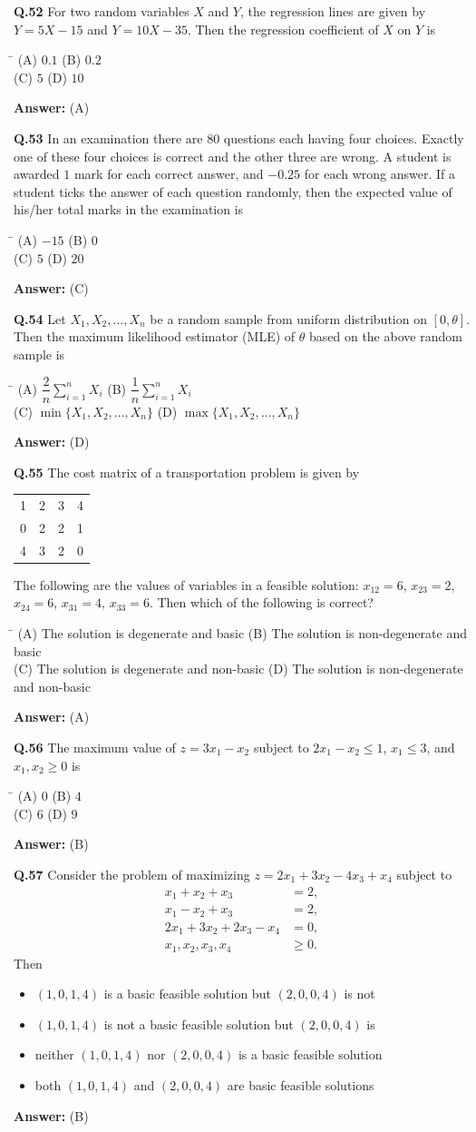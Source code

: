 \documentclass[11pt,a4paper]{article}
\newcommand{\optsfourA}[4]{%
  \begin{tabbing}
    \hspace{0.48\linewidth}\=\kill
    (A) #1 \> (B) #2 \\[2pt]
    (C) #3 \> (D) #4
  \end{tabbing}%
}
\newcommand{\optslistA}[4]{%
  \begin{itemize}
    \setlength{\itemsep}{2pt}\setlength{\parskip}{0pt}
    \item[(A)] #1
    \item[(B)] #2
    \item[(C)] #3
    \item[(D)] #4
  \end{itemize}%
}
\newcommand{\ans}[1]{\textbf{Answer:} #1\par\medskip}
\begin{document}
\textbf{Q.52} For two random variables $X$ and $Y$, the regression lines are given by $Y = 5X - 15$ and $Y = 10X - 35$. Then the regression coefficient of $X$ on $Y$ is
\optsfourA{$0.1$}{$0.2$}{$5$}{$10$}
\ans{(A)}

\textbf{Q.53} In an examination there are $80$ questions each having four choices. Exactly one of these four choices is correct and the other three are wrong. A student is awarded $1$ mark for each correct answer, and $-0.25$ for each wrong answer. If a student ticks the answer of each question randomly, then the expected value of his/her total marks in the examination is
\optsfourA{$-15$}{$0$}{$5$}{$20$}
\ans{(C)}

\textbf{Q.54} Let $X_1, X_2, \dots, X_n$ be a random sample from uniform distribution on $[0, \theta]$. Then the maximum likelihood estimator (MLE) of $\theta$ based on the above random sample is
\optsfourA{$\dfrac{2}{n}\displaystyle\sum_{i=1}^{n} X_i$}{$\dfrac{1}{n}\displaystyle\sum_{i=1}^{n} X_i$}{$\min\{X_1, X_2, \dots, X_n\}$}{$\max\{X_1, X_2, \dots, X_n\}$}
\ans{(D)}

\textbf{Q.55} The cost matrix of a transportation problem is given by
\begin{center}
\begin{tabular}{cccc}
  \toprule
  1 & 2 & 3 & 4 \\
  0 & 2 & 2 & 1 \\
  4 & 3 & 2 & 0 \\
  \bottomrule
\end{tabular}
\end{center}
The following are the values of variables in a feasible solution: $x_{12} = 6$, $x_{23} = 2$, $x_{24} = 6$, $x_{31} = 4$, $x_{33} = 6$. Then which of the following is correct?
\optsfourA{The solution is degenerate and basic}{The solution is non-degenerate and basic}{The solution is degenerate and non-basic}{The solution is non-degenerate and non-basic}
\ans{(A)}

\textbf{Q.56} The maximum value of $z = 3x_1 - x_2$ subject to $2x_1 - x_2 \le 1$, $x_1 \le 3$, and $x_1, x_2 \ge 0$ is
\optsfourA{$0$}{$4$}{$6$}{$9$}
\ans{(B)}

\textbf{Q.57} Consider the problem of maximizing $z = 2x_1 + 3x_2 - 4x_3 + x_4$ subject to
\begin{align*}
  x_1 + x_2 + x_3 &= 2, \\
  x_1 - x_2 + x_3 &= 2, \\
  2x_1 + 3x_2 + 2x_3 - x_4 &= 0, \\
  x_1, x_2, x_3, x_4 &\ge 0.
\end{align*}
Then
\optslistA{$(1,0,1,4)$ is a basic feasible solution but $(2,0,0,4)$ is not}{$(1,0,1,4)$ is not a basic feasible solution but $(2,0,0,4)$ is}{neither $(1,0,1,4)$ nor $(2,0,0,4)$ is a basic feasible solution}{both $(1,0,1,4)$ and $(2,0,0,4)$ are basic feasible solutions}
\ans{(B)}
\end{document}
